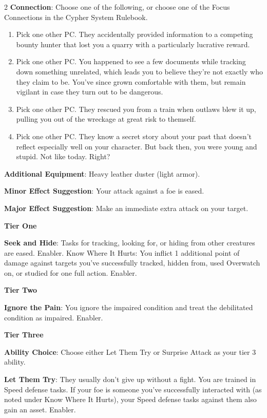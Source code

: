 \begin{multicols}{2}
\textbf{Connection}: Choose one of the following, or choose one of the Focus Connections in the Cypher System Rulebook. 
\begin{enumerate}
\item Pick one other PC. They accidentally provided information to a competing bounty hunter that lost you a quarry with a particularly lucrative reward. 
\item Pick one other PC. You happened to see a few documents while tracking down something unrelated, which leads you to believe they’re not exactly who they claim to be. You’ve since grown comfortable with them, but remain vigilant in case they turn out to be dangerous. 
\item Pick one other PC. They rescued you from a train when outlaws blew it up, pulling you out of the wreckage at great risk to themself. 
\item Pick one other PC. They know a secret story about your past that doesn’t reflect especially well on your character. But back then, you were young and stupid. Not like today. Right?
\end{enumerate} 

\textbf{Additional Equipment}: Heavy leather duster (light armor). 

\textbf{Minor Effect Suggestion}: Your attack against a foe is eased. 

\textbf{Major Effect Suggestion}: Make an immediate extra attack on your target.

\textbf{Tier One}

\textbf{Seek and Hide}: Tasks for tracking, looking for, or hiding from other creatures are eased. Enabler. 
Know Where It Hurts: You inflict 1 additional point of damage against targets you’ve successfully tracked, hidden from, used Overwatch on, or studied for one full action. Enabler. 

\textbf{Tier Two}
 
\textbf{Ignore the Pain}: You ignore the impaired condition and treat the debilitated condition as impaired. Enabler. 

\textbf{Tier Three}

\textbf{Ability Choice}: Choose either Let Them Try or Surprise Attack as your tier 3 ability. 

\textbf{Let Them Try}: They usually don’t give up without a fight. You are trained in Speed defense tasks. If your foe is someone you’ve successfully interacted with (as noted under Know Where It Hurts), your Speed defense tasks against them also gain an asset. Enabler. 


\end{multicols}
